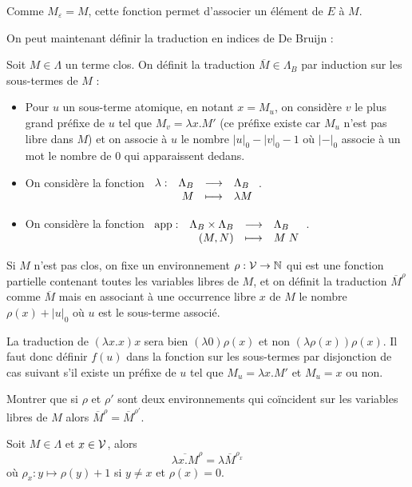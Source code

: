 \begin{rmk}
    Comme $M_\varepsilon = M$, cette fonction permet d'associer un élément de $E$ à $M$.
\end{rmk}

On peut maintenant définir la traduction en indices de De Bruijn :

\begin{defi}
    Soit $M\in\Lambda$ un terme clos. On définit la traduction $\overline M \in \Lambda_B$ par induction sur les sous-termes de $M$ :
    \begin{itemize}[label=$\bullet$]
        \item Pour $u$ un sous-terme atomique, en notant $x = M_u$, on considère $v$ le plus grand préfixe de $u$ tel que $M_v = \lambda x.M'$ (ce préfixe existe car $M_u$ n'est pas libre dans $M$) et on associe à $u$ le nombre $|u|_0-|v|_0-1$ où $|-|_0$ associe à un mot le nombre de $0$ qui apparaissent dedans.
        \item On considère la fonction $\begin{array}[t]{lrcl} \lambda: & \Lambda_B & \longrightarrow & \Lambda_B \\ & M & \longmapsto & \lambda M \end{array}$.
        \item On considère la fonction $\begin{array}[t]{lrcl} \mathrm{app}: & \Lambda_B\times\Lambda_B & \longrightarrow & \Lambda_B \\ & (M,N) & \longmapsto & M\;N \end{array}$.
    \end{itemize}

    Si $M$ n'est pas clos, on fixe un environnement $\rho : \mathcal V\to \mathbb{N}$ qui est une fonction partielle contenant toutes les variables libres de $M$, et on définit la traduction $\overline M^\rho$ comme $\overline M$ mais en associant à une occurrence libre $x$ de $M$ le nombre $\rho(x)+|u|_0$ où $u$ est le sous-terme associé.
\end{defi}

\begin{rmk}
    La traduction de $(\lambda x.x)x$ sera bien $(\lambda 0)\rho(x)$ et non $(\lambda \rho(x))\rho(x)$. Il faut donc définir $f(u)$ dans la fonction sur les sous-termes par disjonction de cas suivant s'il existe un préfixe de $u$ tel que $M_u = \lambda x.M'$ et $M_u = x$ ou non.
\end{rmk}

\begin{exo}
    Montrer que si $\rho$ et $\rho'$ sont deux environnements qui coïncident sur les variables libres de $M$ alors $\overline M^\rho =\overline M ^{\rho'}$.
\end{exo}

\begin{prop}
    Soit $M\in\Lambda$ et $x\in\mathcal V$, alors $$\overline{\lambda x.M}^\rho = \lambda \overline{M}^{\rho_x}$$ où $\rho_x : y \mapsto \rho(y)+1$ si $y\neq x$ et $\rho(x) = 0$.
\end{prop}

